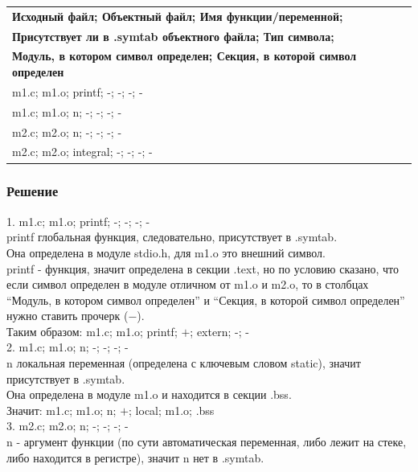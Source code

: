 \documentclass[12pt, letterpaper]{article}
\begin{document}
\begin{center}
    \begin{tabular}{|l|}
        \hline
        \textbf{Исходный файл; Объектный файл; Имя функции/переменной;}\\ \textbf{Присутствует ли в .symtab объектного файла; Тип символа;}\\ \textbf{Модуль, в котором символ определен; Секция, в которой символ определен}\\
        \hline
        m1.c; m1.o; printf; -; -; -; -\\
        \hline
        m1.c; m1.o; n; -; -; -; -\\
        \hline
        m2.c; m2.o; n; -; -; -; -\\
        \hline
        m2.c; m2.o; integral; -; -; -; -\\
        \hline
    \end{tabular}
\end{center}
\newpage

\subsubsection{Решение}
1. m1.c; m1.o; printf; -; -; -; -\\
printf глобальная функция, следовательно, присутствует в .symtab.\\
Она определена в модуле stdio.h, для m1.o это внешний символ.\\
printf - функция, значит определена в секции .text, но по условию сказано, что если символ определен в модуле отличном от m1.o и m2.o, то в столбцах ``Модуль, в котором символ определен'' и ``Секция, в которой символ определен'' нужно ставить прочерк ($-$).\\

Таким образом: m1.c; m1.o; printf; $+$; extern; -; -\\

2. m1.c; m1.o; n; -; -; -; -\\
n локальная переменная (определена с ключевым словом static), значит присутствует в .symtab.\\
Она определена в модуле m1.o и находится в секции .bss.\\

Значит: m1.c; m1.o; n; $+$; local; m1.o; .bss\\

3. m2.c; m2.o; n; -; -; -; -\\
n - аргумент функции (по сути автоматическая переменная, либо лежит на стеке, либо находится в регистре), значит n нет в .symtab.\\
\end{document}
